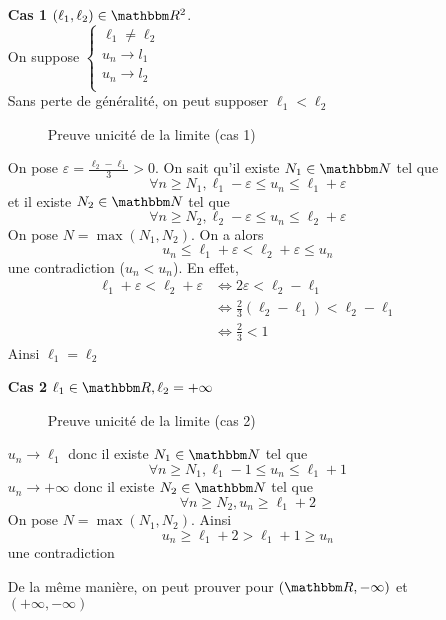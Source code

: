 \begin{prv}
	\begin{itemize}
		\item[\sc\bf Cas 1] $(\ell_1, \ell_2) \in \R^2$.\\
				On suppose $\begin{cases}
				\ell_1 \neq \ell_2\\
				u_n \rightarrow l_1\\
				u_n \rightarrow l_2\\
			\end{cases}$\\
			Sans perte de généralité, on peut supposer $\ell_1 < \ell_2$

			\begin{figure}[H]
					\centering
					\caption{Preuve unicité de la limite (cas 1)}
					\label{fig:preuve-unicité-de-la-limite}
			\end{figure}
			
			On pose $\varepsilon = \frac{\ell_2-\ell_1}{3} > 0$. On sait qu'il existe $N_1 \in \N$ tel que \[
			\forall n \ge  N_1, \ell_1- \varepsilon \le u_n \le  \ell_1 + \varepsilon
			\] et il existe $N_2 \in \N$ tel que \[
			\forall n \ge N_2, \ell_2 - \varepsilon \le u_n \le  \ell_2 + \varepsilon
			\]
			On pose $N = \max(N_1, N_2)$. On a alors \[
				u_n \le  \ell_1 + \varepsilon < \ell_2+ \varepsilon \le u_n
			\] une contradiction ($u_n < u_n$).
			En effet,
			\begin{align*}
				\ell_1+\varepsilon < \ell_2+\varepsilon &\iff 2\varepsilon < \ell_2-\ell_1\\
																								&\iff \frac{2}{3}(\ell_2-\ell_1) < \ell_2-\ell_1\\
																								&\iff \frac{2}{3} < 1
			\end{align*}
			Ainsi $\ell_1 = \ell_2$ \\
		\item[\sc\bf Cas 2] $\ell_1\in \R, \ell_2=+\infty$ 
			\begin{figure}[H]
					\centering
					\caption{Preuve unicité de la limite (cas 2)}
					\label{fig:preuve-unicité-de-la-limite-2}
			\end{figure}

			$u_n \to \ell_1$ donc il existe $N_1 \in \N$ tel que \[
			\forall n \ge  N_1, \ell_1 - 1 \le u_n \le \ell_1+1
			\]
			$u_n \to +\infty$ donc il existe $N_2\in \N$ tel que \[
			\forall n \ge  N_2, u_n \ge  \ell_1+2
			\] 
			On pose $N = \max(N_1, N_2)$. Ainsi \[
			u_n \ge  \ell_1+2 > \ell_1+1\ge u_n
			\] une contradiction\\

		\item[] De la même manière, on peut prouver pour $(\R, -\infty)$ et $(+\infty, -\infty)$
	\end{itemize}
\end{prv}

